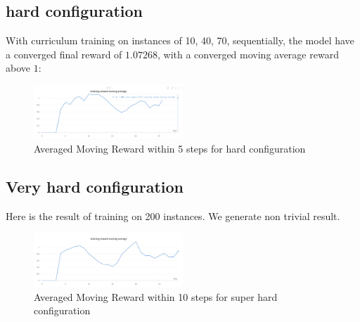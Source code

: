 \documentclass{article}
\begin{document}
\subsection{hard configuration}
With curriculum training on instances of 10, 40, 70, sequentially, the model have a converged final reward of $1.07268 $, with a converged moving average reward above $1$: 
\begin{figure}[H]
\centering
\includegraphics[width=0.5\textwidth]{hard_config.png}
\caption{Averaged Moving Reward within 5 steps for hard configuration}    
\end{figure} 

\subsection{Very hard configuration}
Here is the result of training on 200 instances. We generate non trivial result.
\begin{figure}[H]
\centering
\includegraphics[width=0.5\textwidth]{superhard_config}
\caption{Averaged Moving Reward within 10 steps for super hard configuration}    
\end{figure} 
\end{document}
